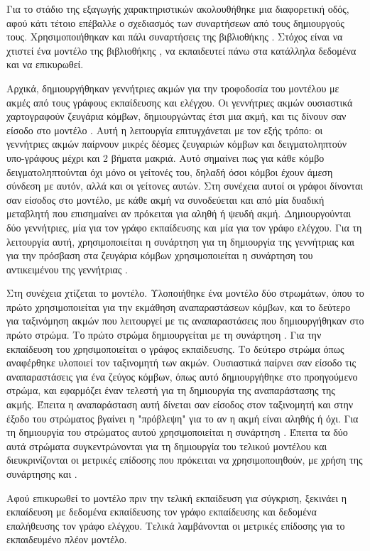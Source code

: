 Για το στάδιο της εξαγωγής χαρακτηριστικών ακολουθήθηκε μια διαφορετική οδός, αφού κάτι τέτοιο
επέβαλλε ο σχεδιασμός των συναρτήσεων από τους δημιουργούς τους. Χρησιμοποιήθηκαν και πάλι 
συναρτήσεις της βιβλιοθήκης  \cite{StellarGraph}. Στόχος είναι να χτιστεί ένα
μοντέλο της βιβλιοθήκης  \cite{keras}, να εκπαιδευτεί πάνω στα κατάλληλα δεδομένα και
να επικυρωθεί.

Αρχικά, δημιουργήθηκαν γεννήτριες ακμών για την τροφοδοσία του μοντέλου με ακμές από τους γράφους
εκπαίδευσης και ελέγχου. Οι γεννήτριες ακμών ουσιαστικά χαρτογραφούν ζευγάρια κόμβων, δημιουργώντας
έτσι μια ακμή, και τις δίνουν σαν είσοδο στο μοντέλο . Αυτή η λειτουργία 
επιτυγχάνεται με τον εξής τρόπο: οι γεννήτριες ακμών παίρνουν μικρές δέσμες  ζευγαριών κόμβων
και δειγματοληπτούν υπο-γράφους μέχρι και 2 βήματα μακριά. Αυτό σημαίνει πως για κάθε κόμβο
δειγματοληπτούνται όχι μόνο οι γείτονές του, δηλαδή όσοι κόμβοι έχουν άμεση σύνδεση με αυτόν, 
αλλά και οι γείτονες αυτών. Στη συνέχεια αυτοί οι γράφοι δίνονται σαν είσοδος στο μοντέλο, 
με κάθε ακμή να συνοδεύεται και από μία δυαδική μεταβλητή που επισημαίνει αν πρόκειται για
αληθή ή ψευδή ακμή. Δημιουργούνται δύο γεννήτριες, μία για τον γράφο εκπαίδευσης και μία για τον 
γράφο ελέγχου. Για τη λειτουργία αυτή, χρησιμοποιείται η συνάρτηση
 για τη δημιουργία της γεννήτριας και για την
πρόσβαση στα ζευγάρια κόμβων χρησιμοποιείται η συνάρτηση του αντικειμένου της γεννήτριας
.

Στη συνέχεια χτίζεται το μοντέλο. Υλοποιήθηκε ένα μοντέλο  δύο στρωμάτων, όπου το
πρώτο χρησιμοποιείται για την εκμάθηση αναπαραστάσεων κόμβων, και το δεύτερο για ταξινόμηση ακμών
που λειτουργεί με τις αναπαραστάσεις που δημιουργήθηκαν στο πρώτο στρώμα. Το πρώτο στρώμα
δημιουργείται με τη συνάρτηση . Για την εκπαίδευση του
χρησιμοποιείται ο γράφος εκπαίδευσης. Το δεύτερο στρώμα όπως αναφέρθηκε υλοποιεί τον ταξινομητή 
των ακμών. Ουσιαστικά παίρνει σαν είσοδο τις αναπαραστάσεις για ένα ζεύγος κόμβων, όπως αυτό 
δημιουργήθηκε στο προηγούμενο στρώμα, και εφαρμόζει έναν τελεστή για τη δημιουργία της 
αναπαράστασης της ακμής. Έπειτα η αναπαράσταση αυτή δίνεται σαν είσοδος στον ταξινομητή και 
στην έξοδο του στρώματος βγαίνει η "πρόβλεψη" για το αν η ακμή είναι αληθής ή όχι. Για τη 
δημιουργία του στρώματος αυτού χρησιμοποιείται η συνάρτηση  
. Έπειτα τα δύο αυτά στρώματα συγκεντρώνονται για τη 
δημιουργία του τελικού μοντέλου  \cite{keras} και διευκρινίζονται οι μετρικές
επίδοσης που πρόκειται να χρησιμοποιηθούν, με χρήση της συνάρτησης 
 και .

Αφού επικυρωθεί το μοντέλο πριν την τελική εκπαίδευση για σύγκριση, ξεκινάει η εκπαίδευση με
δεδομένα εκπαίδευσης τον γράφο εκπαίδευσης και δεδομένα επαλήθευσης τον γράφο ελέγχου. Τελικά
λαμβάνονται οι μετρικές επίδοσης για το εκπαιδευμένο πλέον μοντέλο.